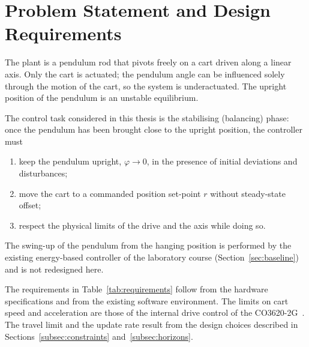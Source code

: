 \section{Problem Statement and Design Requirements}
\label{sec:requirements}

The plant is a pendulum rod that pivots freely on a cart driven along a linear
axis. Only the cart is actuated; the pendulum angle can be influenced solely
through the motion of the cart, so the system is underactuated. The upright
position of the pendulum is an unstable equilibrium.

The control task considered in this thesis is the stabilising (balancing)
phase: once the pendulum has been brought close to the upright position, the
controller must
\begin{enumerate}
  \item keep the pendulum upright, $\varphi \rightarrow 0$, in the presence of
        initial deviations and disturbances;
  \item move the cart to a commanded position set-point $r$ without steady-state
        offset;
  \item respect the physical limits of the drive and the axis while doing so.
\end{enumerate}
The swing-up of the pendulum from the hanging position is performed by the
existing energy-based controller of the laboratory course
(Section~\ref{sec:baseline}) and is not redesigned here.

The requirements in Table~\ref{tab:requirements} follow from the hardware
specifications and from the existing software environment. The limits on cart
speed and acceleration are those of the internal drive control of the
CO3620-2G~\cite{ln_manual}. The travel limit and the update rate result from
the design choices described in Sections~\ref{subsec:constraints}
and~\ref{subsec:horizons}.

